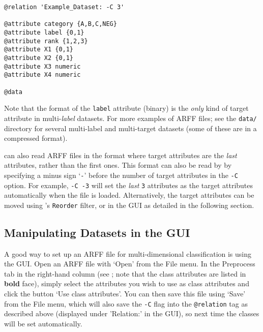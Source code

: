 \documentclass[11pt]{article}
\newcommand{\MEKA}{Meka}
\newcommand{\WEKA}{Weka}
\newcommand{\MULAN}{Mulan}
\begin{document}
{\small

\begin{lstlisting}
@relation 'Example_Dataset: -C 3'

@attribute category {A,B,C,NEG}
@attribute label {0,1}
@attribute rank {1,2,3}
@attribute X1 {0,1}
@attribute X2 {0,1}
@attribute X3 numeric
@attribute X4 numeric

@data
\end{lstlisting}
}

Note that the format of the \texttt{label} attribute (binary) is the \emph{only} kind of target attribute in multi-\emph{label} datasets. For more examples of \framework{\MEKA} ARFF files; see the \texttt{data/} directory for several multi-label and multi-target datasets (some of these are in a compressed format).

\framework{\MEKA} can also read ARFF files in the \framework{\MULAN} format where target attributes are the \emph{last} attributes, rather than the first ones. This format can also be read by \framework{\MEKA} by specifying a minus sign `\texttt{-}' before the number of target attributes in the \texttt{-C} option. For example, \texttt{-C -3} will set the \emph{last} \texttt{3} attributes as the target attributes automatically when the file is loaded. Alternatively, the target attributes can be moved using \framework{\WEKA}'s \texttt{Reorder} filter, or in the GUI as detailed in the following section. %


\subsection{Manipulating Datasets in the GUI}
\label{sec:data.gui}

A good way to set up an ARFF file for multi-dimensional classification is using the GUI. Open an ARFF file with `\textsf{Open}' from the \textsf{File} menu. In the \textsf{Preprocess} tab in the right-hand column (see ; note that the class attributes are listed in \textbf{bold} face), simply select the attributes you wish to use as class attributes and click the button `\textsf{Use class attributes}'. You can then save this file using `\textsf{Save}' from the \textsf{File} menu, which will also save the \texttt{-C} flag into the \texttt{@relation} tag as described above (displayed under '\textsf{Relation:}' in the GUI), so next time the classes will be set automatically.
\end{document}
